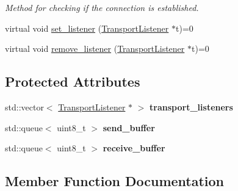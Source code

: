 \begin{DoxyCompactItemize}
\begin{DoxyCompactList}\small\item\em Method for checking if the connection is established. \end{DoxyCompactList}\item 
virtual void \hyperlink{class_transport_protocol_ad7a9c131bbd9b2a26f1884b18ce11820}{set\+\_\+listener} (\hyperlink{class_transport_listener}{Transport\+Listener} $\ast$t)=0
\item 
virtual void \hyperlink{class_transport_protocol_ac7fcdf3b49efae156223bb3351c49553}{remove\+\_\+listener} (\hyperlink{class_transport_listener}{Transport\+Listener} $\ast$t)=0
\end{DoxyCompactItemize}
\subsection*{Protected Attributes}
\begin{DoxyCompactItemize}
\item 
\hypertarget{class_transport_protocol_a5b8448f205035c7c89fca15b21009617}{}std\+::vector$<$ \hyperlink{class_transport_listener}{Transport\+Listener} $\ast$ $>$ {\bfseries transport\+\_\+listeners}\label{class_transport_protocol_a5b8448f205035c7c89fca15b21009617}

\item 
\hypertarget{class_transport_protocol_a0319fa0da3f02058ce98e8464f1e119a}{}std\+::queue$<$ uint8\+\_\+t $>$ {\bfseries send\+\_\+buffer}\label{class_transport_protocol_a0319fa0da3f02058ce98e8464f1e119a}

\item 
\hypertarget{class_transport_protocol_a5aa66fcb326af8fce0dfdbad9dfdf675}{}std\+::queue$<$ uint8\+\_\+t $>$ {\bfseries receive\+\_\+buffer}\label{class_transport_protocol_a5aa66fcb326af8fce0dfdbad9dfdf675}

\end{DoxyCompactItemize}


\subsection{Member Function Documentation}
\hypertarget{class_transport_protocol_af3f6c35f652d73ea3170c64d2b96ff53}{}
